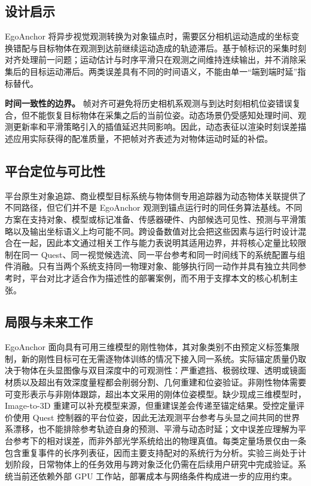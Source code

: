 \documentclass[9pt,twocolumn,letterpaper]{extarticle}
\begin{document}
\subsection{设计启示}


EgoAnchor 将异步视觉观测转换为对象锚点时，需要区分相机运动造成的坐标变换错配与目标物体在观测到达前继续运动造成的轨迹滞后。基于帧标识的采集时刻对齐处理前一问题；运动估计与时序平滑只在观测之间维持连续输出，并不消除采集后的目标运动滞后。两类误差具有不同的时间语义，不能由单一“端到端时延”指标替代。

\textbf{时间一致性的边界。} 帧对齐可避免将历史相机系观测与到达时刻相机位姿错误复合，但不能恢复目标物体在采集之后的当前位姿。动态场景仍受感知处理时间、观测更新率和平滑策略引入的插值延迟共同影响。因此，动态表征以渲染时刻误差描述应用实际获得的配准质量，不把帧对齐表述为对物体运动时延的补偿。

\subsection{平台定位与可比性}

平台原生对象追踪、商业模型目标系统与物体侧专用追踪器为动态物体关联提供了不同路径，但它们并不是 EgoAnchor 观测到锚点运行时的同任务算法基线。不同方案在支持对象、模型或标记准备、传感器硬件、内部候选可见性、预测与平滑策略以及输出坐标语义上均可能不同。跨设备数值对比会把这些因素与运行时设计混合在一起，因此本文通过相关工作与能力表说明其适用边界，并将核心定量比较限制在同一 Quest、同一视觉候选流、同一平台参考和同一时间线下的系统配置与组件消融。只有当两个系统支持同一物理对象、能够执行同一动作并具有独立共同参考时，平台对比才适合作为描述性的部署案例，而不用于支撑本文的核心机制主张。

\subsection{局限与未来工作}


EgoAnchor 面向具有可用三维模型的刚性物体，其对象类别不由预定义标签集限制，新的刚性目标可在无需逐物体训练的情况下接入同一系统。实际锚定质量仍取决于物体在头显图像与双目深度中的可观测性：严重遮挡、极弱纹理、透明或镜面材质以及超出有效深度量程都会削弱分割、几何重建和位姿验证。非刚性物体需要可变形表示与非刚体跟踪，超出本文采用的刚体位姿模型。缺少现成三维模型时，Image-to-3D 重建可以补充模型来源，但重建误差会传递至锚定结果。受控定量评价使用 Quest 控制器的平台位姿，因此无法观测平台参考与头显之间共同的世界系漂移，也不能排除参考轨迹自身的预测、平滑与动态时延；文中误差应理解为平台参考下的相对误差，而非外部光学系统给出的物理真值。每类定量场景仅由一条包含重复事件的长序列表征，因而主要支持配对的系统行为分析。实验三尚处于计划阶段，日常物体上的任务效用与跨对象泛化仍需在后续用户研究中完成验证。系统当前还依赖外部 GPU 工作站，部署成本与网络条件构成进一步的应用约束。
\end{document}
